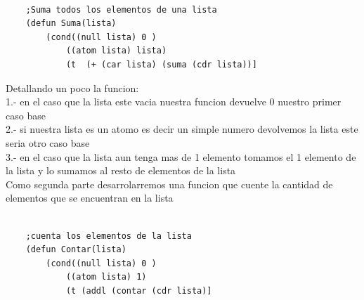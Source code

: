 \documentclass[11pt]{article} %
\begin{document}
\begin{lstlisting}[frame=single]
	
	;Suma todos los elementos de una lista
	(defun Suma(lista)
		(cond((null lista) 0 )
			((atom lista) lista)
			(t  (+ (car lista) (suma (cdr lista))] 
\end{lstlisting}

Detallando un poco la funcion:\\
1.- en el caso que la lista este vacia nuestra funcion devuelve 0 nuestro primer caso base\\
2.- si nuestra lista es un atomo es decir un simple numero devolvemos la lista este seria otro caso base\\
3.- en el caso que la lista aun tenga mas de 1 elemento tomamos el 1 elemento de la lista y lo sumamos al resto de elementos de la lista\\

Como segunda parte desarrolarremos una funcion que cuente la cantidad de elementos que se encuentran en la lista

\lstset{language=LISP}          %

\begin{lstlisting}[frame=single]
	
	;cuenta los elementos de la lista
	(defun Contar(lista)
		(cond((null lista) 0 )
			((atom lista) 1)
			(t (addl (contar (cdr lista)] 
\end{lstlisting}
\end{document}
